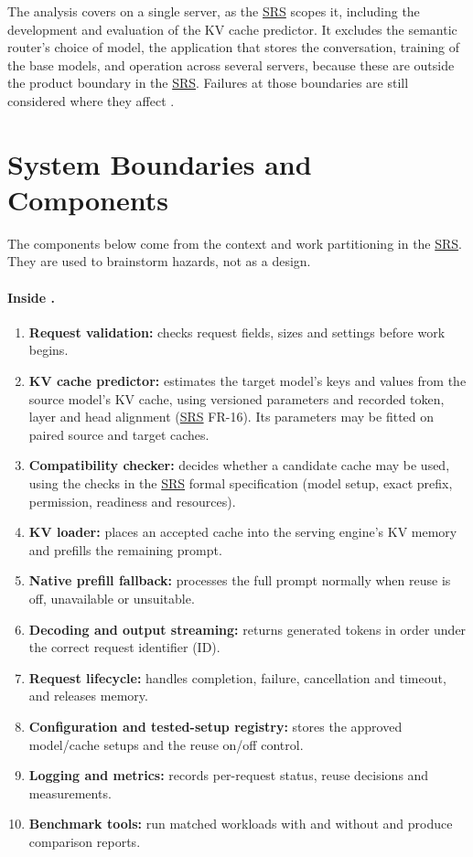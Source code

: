 \documentclass{article}
\newcommand{\srs}{\href{https://tandemkv.github.io/Tandem/SRS-Volere/SRS.pdf}{SRS}}
\begin{document}
The analysis covers \progname{} on a single server, as the \srs{} scopes
it, including the development and evaluation of the KV cache predictor. It
excludes the semantic router's choice of model, the application that
stores the conversation, training of the base models, and operation across
several servers, because these are outside the product boundary in the
\srs{}. Failures at those boundaries are still considered where they
affect \progname{}.

\section{System Boundaries and Components}
\label{sec:components}

The components below come from the context and work partitioning in the
\srs{}. They are used to brainstorm hazards, not as a design.

\paragraph{Inside \progname{}.}
\begin{enumerate}[label=C\arabic*., ref=C\arabic*]
  \item \label{comp:validate} \textbf{Request validation:} checks request
  fields, sizes and settings before work begins.
  \item \label{comp:predict} \textbf{KV cache predictor:} estimates the
  target model's keys and values from the source model's KV cache, using
  versioned parameters and recorded token, layer and head alignment
  (\srs{} FR-16). Its parameters may be fitted on paired source and target
  caches.
  \item \label{comp:check} \textbf{Compatibility checker:} decides whether a
  candidate cache may be used, using the checks in the \srs{} formal
  specification (model setup, exact prefix, permission, readiness and
  resources).
  \item \label{comp:load} \textbf{KV loader:} places an accepted cache into
  the serving engine's KV memory and prefills the remaining prompt.
  \item \label{comp:native} \textbf{Native prefill fallback:} processes the
  full prompt normally when reuse is off, unavailable or unsuitable.
  \item \label{comp:output} \textbf{Decoding and output streaming:} returns
  generated tokens in order under the correct request identifier (ID).
  \item \label{comp:life} \textbf{Request lifecycle:} handles completion,
  failure, cancellation and timeout, and releases memory.
  \item \label{comp:config} \textbf{Configuration and tested-setup
  registry:} stores the approved model/cache setups and the reuse on/off
  control.
  \item \label{comp:log} \textbf{Logging and metrics:} records per-request
  status, reuse decisions and measurements.
  \item \label{comp:bench} \textbf{Benchmark tools:} run matched workloads
  with and without \progname{} and produce comparison reports.
\end{enumerate}
\end{document}

